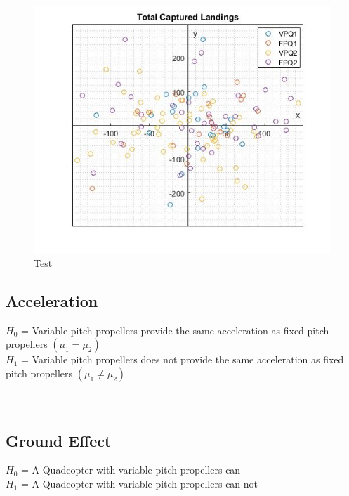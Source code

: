 \begin{figure}[H]
    \centering
    \includegraphics[width = 1\textwidth]{VAPIQ-PICTURES/all}
    \caption{Test}
    \label{fig:landsetup}
\end{figure}


\subsection{Acceleration}
$ H_0$ = Variable pitch propellers provide the same acceleration as fixed pitch propellers $(\mu_1 = \mu_2 )$\\
$ H_1$ = Variable pitch propellers does not provide the same acceleration as fixed pitch propellers $(\mu_1 \neq \mu_2 )$\\
\\\\

\subsection{Ground Effect}
$H_0$ = A Quadcopter with variable pitch propellers can \\
$H_1$ = A Quadcopter with variable pitch propellers can not 
\\\\



